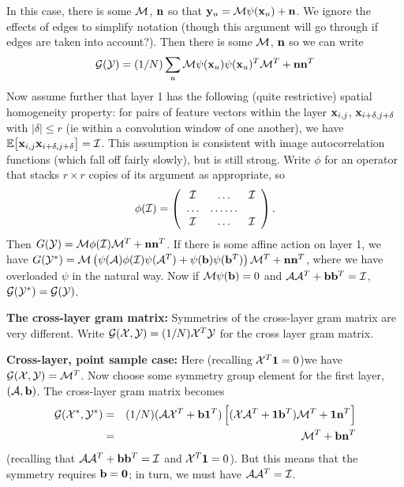 \documentclass[runningheads]{llncs}
\newcommand{\vect}[1]{{\bf {#1}}}
\newcommand{\matx}[1]{{\cal {#1}}}
\newcommand{\expect}[1]{{\mathbb{E}}{{\left[{{#1}}\right]}}}
\begin{document}
In this case, there is some $\matx{M}$, $\vect{n}$ so that 
$\vect{y}_u=\matx{M}\psi(\vect{x}_u)+\vect{n}$.  We ignore the
effects of edges to simplify notation (though this argument will go
through if edges are taken into account?).  Then there is some
$\matx{M}$, $\vect{n}$ so we can write 
\[
{\cal G}(\matx{Y})=(1/N) \sum_u
\matx{M}\psi(\vect{x}_u)\psi(\vect{x}_u)^T\matx{M}^T+\vect{n}\vect{n}^T
\]
Now assume further that
layer 1 has the following (quite restrictive) spatial homogeneity
property: for pairs of feature vectors within the layer $\vect{x}_{i,j}$, $\vect{x}_{i+\delta,
  j+\delta}$ with $\mid \! \delta\!\mid \leq r$ (ie within a convolution window of one
another), we have $\expect{\vect{x}_{i,j}\vect{x}_{i+\delta,
    j+\delta}}=\matx{I}$.  This assumption is consistent with image
autocorrelation functions (which fall off fairly slowly), but is still
strong. Write $\phi$ for an operator
that stacks $r \times r$ copies of its argument as appropriate, so
\[\phi(\matx{I})=\left(\begin{array}{ccc}
\matx{I}&\ldots&\matx{I}\\
\ldots &\ldots \ldots \\
\matx{I}&\ldots&\matx{I}
\end{array}\right).
\]
Then
$G(\matx{Y})=\matx{M}\phi(\matx{I})\matx{M}^T+\vect{n}\vect{n}^T$.
If there is some affine action on layer 1, we have
$G(\matx{Y}^*)=\matx{M}\left(\psi(\matx{A})\phi(\matx{I})\psi(\matx{A}^T)+\psi(\vect{b})\psi(\vect{b}^T)\right)\matx{M}^T+\vect{n}\vect{n}^T$,
where we have overloaded $\psi$ in the natural way.  Now if
$\matx{M}\psi(\vect{b})=0$ and $\matx{A}\matx{A}^T+\vect{b}\vect{b}^T=\matx{I}$, ${\cal
  G}(\matx{Y}^*)={\cal G}(\matx{Y})$. 



{\bf The cross-layer gram matrix:}  Symmetries of the cross-layer gram matrix are very different.  Write
${\cal G}(\matx{X}, \matx{Y})=(1/N) \matx{X}^T\matx{Y}$ for
the cross layer gram matrix.  

{\bf Cross-layer, point sample case:} Here (recalling $\matx{X}^T\vect{1}=0$)we have ${\cal G}(\matx{X},
\matx{Y})=\matx{M}^T$.    Now choose some symmetry group element for the first layer,
$\left(\matx{A}, \vect{b}\right)$.  The cross-layer gram matrix
becomes 
\begin{eqnarray*}
{\cal G}(\matx{X}^*, \matx{Y}^*)&=&(1/N) (\matx{A}
\matx{X}^T+\vect{b}\vect{1}^T)
\left[(\matx{X}
  \matx{A}^T+\vect{1}\vect{b}^T)\matx{M}^T+\vect{1}\vect{n}^T\right]\\
&=&\matx{M}^T+\vect{b}\vect{n}^T
\end{eqnarray*}
(recalling that $\matx{A}\matx{A}^T+\vect{b}\vect{b}^T=\matx{I}$ and
$\matx{X}^T\vect{1}=0$).  But this means that the symmetry requires
$\vect{b}=\vect{0}$; in turn, we must have $\matx{A}\matx{A}^T=\matx{I}$.
\end{document}
